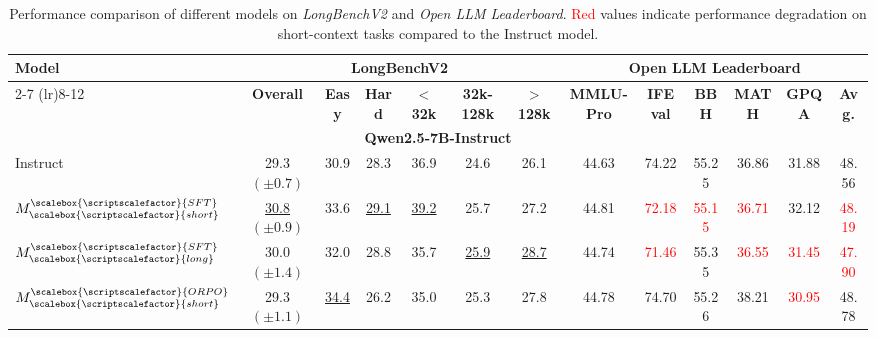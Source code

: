 \begin{table}[th]\tiny
\vspace{-5pt}
\centering
\caption{Performance comparison of different models on \textit{LongBenchV2} and \textit{Open LLM Leaderboard}. \textcolor{red}{Red} values indicate performance degradation on short-context tasks compared to the Instruct model.}
\begin{tabular}{lcccccccccccc}
\toprule
\multirow{2}{*}{\textbf{Model}}&\multicolumn{6}{c}{\textbf{LongBenchV2}}&\multicolumn{6}{c}{\textbf{Open LLM Leaderboard}}\\
\cmidrule(lr){2-7} \cmidrule(lr){8-12}
& \textbf{Overall} & \textbf{Easy} & \textbf{Hard} & \textbf{$<$32k} & \textbf{32k-128k} & \textbf{$>$128k}&\textbf{MMLU-Pro}&\textbf{IFEval}&\textbf{BBH}&\textbf{MATH}&\textbf{GPQA}&\textbf{Avg.}\\
\midrule
\multicolumn{13}{c}{\textbf{Qwen2.5-7B-Instruct}}\\
\midrule
Instruct&29.3$({\pm0.7})$&30.9&28.3&36.9&24.6&26.1& 44.63 & 74.22 & 55.25 & 36.86 & 31.88 & 48.56
\\
$M^{\scalebox{\scriptscalefactor}{SFT}}_{\scalebox{\scriptscalefactor}{short}}$&\underline{30.8}$({\pm}0.9)$&{33.6}&\underline{29.1}&\underline{39.2}&25.7&27.2& 44.81 & \textcolor{red}{72.18} & \textcolor{red}{55.15} & \textcolor{red}{36.71} & 32.12 & \textcolor{red}{48.19} \\
$M^{\scalebox{\scriptscalefactor}{SFT}}_{\scalebox{\scriptscalefactor}{long}}$& 30.0$({\pm1.4})$&32.0&28.8&35.7&\underline{25.9}&\underline{28.7}&44.74 & \textcolor{red}{71.46} & 55.35 & \textcolor{red}{36.55} & \textcolor{red}{31.45} & \textcolor{red}{47.90} \\
$M^{\scalebox{\scriptscalefactor}{ORPO}}_{\scalebox{\scriptscalefactor}{short}}$&{29.3}$({\pm1.1})$&\underline{34.4}&{26.2}&{35.0}&25.3&27.8& 44.78 & 74.70 & 55.26 & 38.21 & \textcolor{red}{30.95}& 48.78 \\

\end{tabular}
\end{table}
